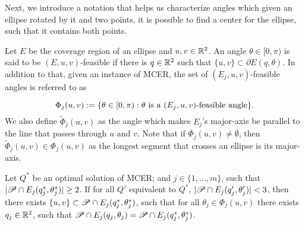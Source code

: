 Next, we introduce a notation that helps us characterize angles which given an ellipse rotated by it and two points, it is possible to find a center for the ellipse, such that it contains both points.

\begin{definition}\label{def:feasible_angle}
	Let $E$ be the coverage region of an ellipse and $u, v \in \mathbb{R}^2$. An angle $\theta \in [0, \pi)$ is said to be $(E, u, v)$-feasible if there is $q \in \mathbb{R}^2$ such that $\{u, v\} \subset \partial E(q, \theta)$.
	In addition to that, given an instance of MCER, the set of $(E_j, u, v)$-feasible angles is referred to as 
	
	\begin{equation}
	\Phi_j(u, v) := \{\theta \in [0, \pi) : \theta \textnormal{ is a } (E_j,u,v)\textnormal{-feasible angle}\}.
	\end{equation}
	We also define $\tilde{\Phi}_j(u,v)$ as the angle which makes $E_j$'s major-axis be parallel to the line that passes through $u$ and $v$. Note that if $\Phi_j(u,v) \neq \emptyset$, then $\tilde{\Phi}_j(u,v) \in \Phi_j(u,v)$ as the longest segment that crosses an ellipse is its major-axis.
\end{definition}

\begin{lem}\label{lema:3pnts}
	Let $Q^*$ be an optimal solution of MCER; and $j\in\{1, \dots, m\}$, such that $|\mathscr{P} \cap E_j(q_j^*, \theta_j^*)|\ge2$.
	If for all $Q'$ equivalent to $Q^*$, $|\mathscr{P} \cap E_j(q_j', \theta_j')| < 3$, then there exists $\{u, v\} \subset \mathscr{P} \cap E_j(q_j^*, \theta_j^*)$, such that for all $\theta_j\in \Phi_j(u,v)$ there exists $q_j \in \mathbb{R}^2$, such that $\mathscr{P} \cap E_j(q_j, \theta_j) = \mathscr{P} \cap E_j(q_j^*, \theta_j^*)$.
	
	
	
	 
	
\end{lem}

